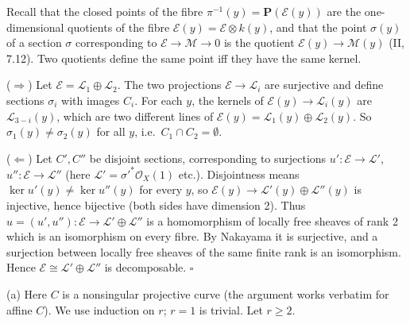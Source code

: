 \documentclass[11pt]{article}
\begin{document}
\pf
Recall that the closed points of the fibre $\pi^{-1}(y)=\mathbf P(\mathcal E(y))$ are the one-dimensional quotients of the fibre $\mathcal E(y)=\mathcal E\otimes k(y)$, and that the point $\sigma(y)$ of a section $\sigma$ corresponding to $\mathcal E\to\mathcal M\to0$ is the quotient $\mathcal E(y)\to\mathcal M(y)$ (II, 7.12). Two quotients define the same point iff they have the same kernel.

($\Rightarrow$) Let $\mathcal E=\mathcal L_1\oplus\mathcal L_2$. The two projections $\mathcal E\to\mathcal L_i$ are surjective and define sections $\sigma_i$ with images $C_i$. For each $y$, the kernels of $\mathcal E(y)\to\mathcal L_i(y)$ are $\mathcal L_{3-i}(y)$, which are two different lines of $\mathcal E(y)=\mathcal L_1(y)\oplus\mathcal L_2(y)$. So $\sigma_1(y)\ne\sigma_2(y)$ for all $y$, i.e.\ $C_1\cap C_2=\emptyset$.

($\Leftarrow$) Let $C',C''$ be disjoint sections, corresponding to surjections $u'\colon\mathcal E\to\mathcal L'$, $u''\colon\mathcal E\to\mathcal L''$ (here $\mathcal L'=\sigma'^*\mathcal O_X(1)$ etc.). Disjointness means $\ker u'(y)\ne\ker u''(y)$ for every $y$, so $\mathcal E(y)\to\mathcal L'(y)\oplus\mathcal L''(y)$ is injective, hence bijective (both sides have dimension 2). Thus $u=(u',u'')\colon\mathcal E\to\mathcal L'\oplus\mathcal L''$ is a homomorphism of locally free sheaves of rank 2 which is an isomorphism on every fibre. By Nakayama it is surjective, and a surjection between locally free sheaves of the same finite rank is an isomorphism. Hence $\mathcal E\cong\mathcal L'\oplus\mathcal L''$ is decomposable. \hfill$\square$

\pf
(a) Here $C$ is a nonsingular projective curve (the argument works verbatim for affine $C$). We use induction on $r$; $r=1$ is trivial. Let $r\ge2$.
\end{document}

